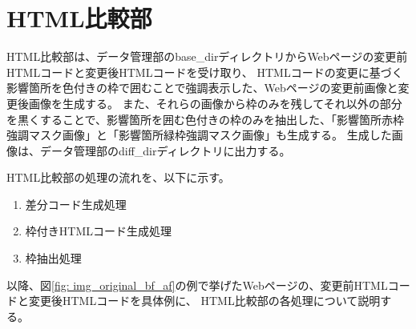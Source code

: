 \section{HTML比較部}\label{sec:Affected_area_extraction}
HTML比較部は、データ管理部のbase\_dirディレクトリからWebページの変更前HTMLコードと変更後HTMLコードを受け取り、
HTMLコードの変更に基づく影響箇所を色付きの枠で囲むことで強調表示した、Webページの変更前画像と変更後画像を生成する。
また、それらの画像から枠のみを残してそれ以外の部分を黒くすることで、影響箇所を囲む色付きの枠のみを抽出した、「影響箇所赤枠強調マスク画像」と「影響箇所緑枠強調マスク画像」も生成する。
生成した画像は、データ管理部のdiff\_dirディレクトリに出力する。
\par
HTML比較部の処理の流れを、以下に示す。
\begin{enumerate}
    \item 差分コード生成処理
    \item 枠付きHTMLコード生成処理
    \item 枠抽出処理
\end{enumerate}
\par
以降、図\ref{fig: img_original_bf_af}の例で挙げたWebページの、変更前HTMLコードと変更後HTMLコードを具体例に、
HTML比較部の各処理について説明する。

